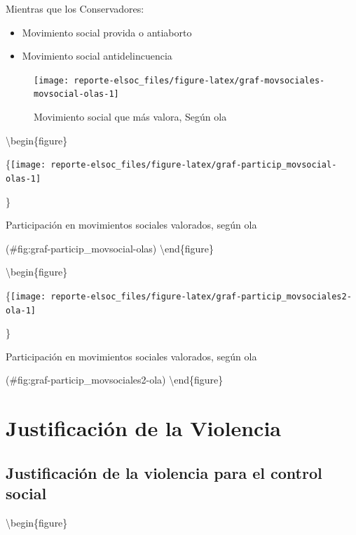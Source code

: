 \documentclass[
  12pt,
]{book}
\providecommand{\tightlist}{%
  \setlength{\itemsep}{0pt}\setlength{\parskip}{0pt}}
\begin{document}
Mientras que los Conservadores:

\begin{itemize}
\tightlist
\item
  Movimiento social provida o antiaborto
\item
  Movimiento social antidelincuencia
\end{itemize}

\begin{figure}

{\centering \texttt{[image: reporte-elsoc\_files/figure-latex/graf-movsociales-movsocial-olas-1]} 

}

\caption{Movimiento social que más valora, Según ola}\label{fig:graf-movsociales-movsocial-olas}
\end{figure}

\textbackslash begin\{figure\}

\{\centering \texttt{[image: reporte-elsoc\_files/figure-latex/graf-particip\_movsocial-olas-1]}

\}

\caption{Participación en movimientos sociales valorados, según ola}

(\#fig:graf-particip\_movsocial-olas)
\textbackslash end\{figure\}

\textbackslash begin\{figure\}

\{\centering \texttt{[image: reporte-elsoc\_files/figure-latex/graf-particip\_movsociales2-ola-1]}

\}

\caption{Participación en movimientos sociales valorados, según ola}

(\#fig:graf-particip\_movsociales2-ola)
\textbackslash end\{figure\}

\hypertarget{justificaciuxf3n-de-la-violencia}{%
\section{Justificación de la Violencia}\label{justificaciuxf3n-de-la-violencia}}

\hypertarget{justificaciuxf3n-de-la-violencia-para-el-control-social}{%
\subsection{Justificación de la violencia para el control social}\label{justificaciuxf3n-de-la-violencia-para-el-control-social}}

\textbackslash begin\{figure\}
\end{document}

